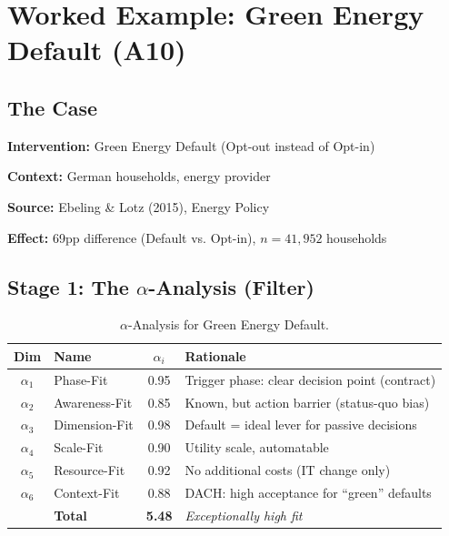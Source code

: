 
\section{Worked Example: Green Energy Default (A10)}
\label{sec:iii-example}

\subsection{The Case}

\textbf{Intervention:} Green Energy Default (Opt-out instead of Opt-in)

\textbf{Context:} German households, energy provider

\textbf{Source:} Ebeling \& Lotz (2015), Energy Policy

\textbf{Effect:} 69pp difference (Default vs. Opt-in), $n = 41{,}952$ households

\subsection{Stage 1: The $\alpha$-Analysis (Filter)}

\begin{table}[h]
\centering
\begin{tabular}{clcp{6cm}}
\toprule
\textbf{Dim} & \textbf{Name} & \textbf{$\alpha_i$} & \textbf{Rationale} \\
\midrule
$\alpha_1$ & Phase-Fit & 0.95 & Trigger phase: clear decision point (contract) \\
$\alpha_2$ & Awareness-Fit & 0.85 & Known, but action barrier (status-quo bias) \\
$\alpha_3$ & Dimension-Fit & 0.98 & Default = ideal lever for passive decisions \\
$\alpha_4$ & Scale-Fit & 0.90 & Utility scale, automatable \\
$\alpha_5$ & Resource-Fit & 0.92 & No additional costs (IT change only) \\
$\alpha_6$ & Context-Fit & 0.88 & DACH: high acceptance for ``green'' defaults \\
\midrule
& \textbf{Total} & \textbf{5.48} & \emph{Exceptionally high fit} \\
\bottomrule
\end{tabular}
\caption{$\alpha$-Analysis for Green Energy Default.}
\end{table}

